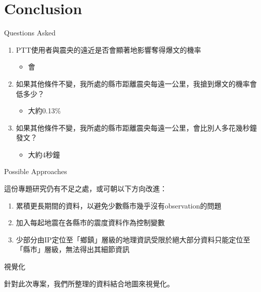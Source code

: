 

\section{Conclusion}



%
\begin{frame}[fragile]{Questions Asked}
    \begin{enumerate}
        \item PTT使用者與震央的遠近是否會顯著地影響奪得爆文的機率
            \begin{itemize}
                \item 會
            \end{itemize}
        \item 如果其他條件不變，我所處的縣市距離震央每遠一公里，我搶到爆文的機率會低多少？
            \begin{itemize}
                \item 大約0.13\%
            \end{itemize}
        \item 如果其他條件不變，我所處的縣市距離震央每遠一公里，會比別人多花幾秒鐘發文？
            \begin{itemize}
                \item 大約4秒鐘
            \end{itemize}
    \end{enumerate}

\end{frame}


%
\begin{frame}[fragile]{Possible Approaches}

這份專題研究仍有不足之處，或可朝以下方向改進：
    \begin{enumerate}
        \item 累積更長期間的資料，以避免少數縣市幾乎沒有observation的問題
        \item 加入每起地震在各縣市的震度資料作為控制變數
        \item 少部分由IP定位至「鄉鎮」層級的地理資訊受限於絕大部分資料只能定位至「縣市」層級，無法得出其細節資訊
    \end{enumerate}

\end{frame}


%
\begin{frame}[fragile]{視覺化}

針對此次專案，我們所整理的資料結合地圖來視覺化。

\end{frame}
